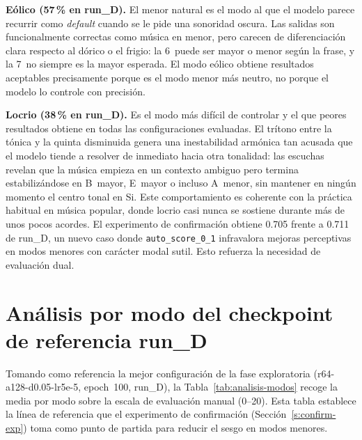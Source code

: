 \documentclass[%
    school=etsisi,%
    type=pfg,%
    degree=61CD,%
]{upm-report}
\begin{document}
\textbf{E\'olico (57\,\% en run\_D).} El menor natural es el modo al que el modelo parece recurrir como \textit{default} cuando se le pide una sonoridad oscura. Las salidas son funcionalmente correctas como m\'usica en menor, pero carecen de diferenciaci\'on clara respecto al d\'orico o el frigio: la 6\textordfeminine\ puede ser mayor o menor seg\'un la frase, y la 7\textordfeminine\ no siempre es la mayor esperada. El modo e\'olico obtiene resultados aceptables precisamente porque es el modo menor m\'as neutro, no porque el modelo lo controle con precisi\'on.

\textbf{Locrio (38\,\% en run\_D).} Es el modo m\'as dif\'icil de controlar y el que peores resultados obtiene en todas las configuraciones evaluadas. El tr\'itono entre la t\'onica y la quinta disminuida genera una inestabilidad arm\'onica tan acusada que el modelo tiende a resolver de inmediato hacia otra tonalidad: las escuchas revelan que la m\'usica empieza en un contexto ambiguo pero termina estabiliz\'andose en B~mayor, E~mayor o incluso A~menor, sin mantener en ning\'un momento el centro tonal en Si. Este comportamiento es coherente con la pr\'actica habitual en m\'usica popular, donde locrio casi nunca se sostiene durante m\'as de unos pocos acordes. El experimento de confirmaci\'on obtiene 0.705 frente a 0.711 de run\_D, un nuevo caso donde \texttt{auto\_score\_0\_1} infravalora mejoras perceptivas en modos menores con car\'acter modal sutil. Esto refuerza la necesidad de evaluaci\'on dual.

\section{An\'alisis por modo del checkpoint de referencia run\_D}
\label{s:analisis-modos-ref}

Tomando como referencia la mejor configuraci\'on de la fase exploratoria (r64-a128-d0.05-lr5e-5, epoch~100, run\_D), la Tabla~\ref{tab:analisis-modos} recoge la media por modo sobre la escala de evaluaci\'on manual (0--20). Esta tabla establece la l\'inea de referencia que el experimento de confirmaci\'on (Secci\'on~\ref{s:confirm-exp}) toma como punto de partida para reducir el sesgo en modos menores.
\end{document}
